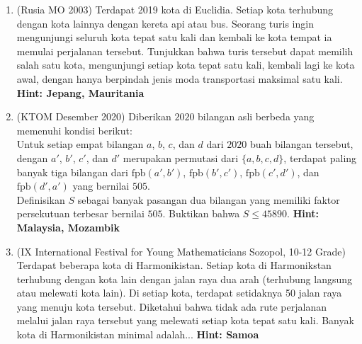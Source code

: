 \documentclass[11pt]{scrartcl}
\begin{document}
\begin{enumerate}
    \item (Rusia MO 2003) Terdapat 2019 kota di Euclidia. Setiap kota terhubung dengan kota lainnya dengan kereta api atau bus. Seorang turis ingin mengunjungi seluruh kota tepat satu kali dan kembali ke kota tempat ia memulai perjalanan tersebut. Tunjukkan bahwa turis tersebut dapat memilih salah satu kota, mengunjungi setiap kota tepat satu kali, kembali lagi ke kota awal, dengan hanya berpindah jenis moda transportasi maksimal satu kali. 
    \textbf{Hint: Jepang, Mauritania}
    \item (KTOM Desember 2020) Diberikan $2020$ bilangan asli berbeda yang memenuhi kondisi berikut:\\Untuk setiap empat bilangan $a$, $b$, $c$, dan $d$ dari $2020$ buah bilangan tersebut, dengan $a'$, $b'$, $c'$, dan $d'$ merupakan permutasi dari $\{a,b,c,d\}$, terdapat paling banyak tiga bilangan dari $\text{fpb}(a',b')$, $\text{fpb}(b',c')$, $\text{fpb}(c',d')$, dan $\text{fpb}(d',a')$ yang bernilai $505$.\\Definisikan $S$ sebagai banyak pasangan dua bilangan yang memiliki faktor persekutuan terbesar bernilai $505$. Buktikan bahwa $S \le 45890$. \textbf{Hint: Malaysia, Mozambik}
    \item (IX International Festival for Young Mathematicians Sozopol, 10-12 Grade) Terdapat beberapa kota di Harmonikistan. Setiap kota di Harmonikstan terhubung dengan kota lain dengan jalan raya dua arah (terhubung langsung atau melewati kota lain). Di setiap kota, terdapat setidaknya 50 jalan raya yang menuju kota tersebut. Diketahui bahwa tidak ada rute perjalanan melalui jalan raya tersebut yang melewati setiap kota tepat satu kali. Banyak kota di Harmonikistan minimal adalah... \textbf{Hint: Samoa}

\end{enumerate}
\end{document}
